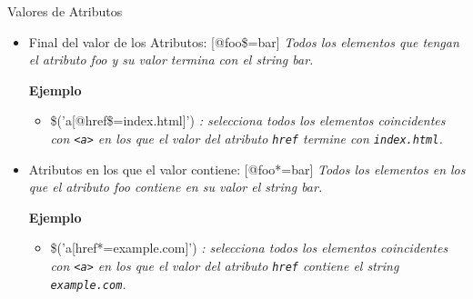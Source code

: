 \begin{frame}[fragile]{Valores de Atributos} %
\begin{itemize}
\item Final del valor de los Atributos: [@foo\$=bar] \textit{Todos los elementos
que tengan el atributo foo y su valor termina con el string bar.}
    
    \textbf{Ejemplo}
    \begin{itemize}
        \item \$('a[@href\$=index.html]') \textit{: selecciona todos los elementos
    coincidentes con \texttt{<a>} en los que el valor del atributo
    \texttt{href} termine con \texttt{index.html}.}
    \end{itemize}

\item Atributos en los que el valor contiene: [@foo*=bar] \textit{Todos los
elementos en los que el atributo foo contiene en su valor el string bar.}
    
    \textbf{Ejemplo}
    \begin{itemize}
        \item \$('a[href*=example.com]') \textit{: selecciona todos los elementos
    coincidentes con \texttt{<a>} en los que el valor del atributo
    \texttt{href} contiene el string \texttt{example.com}.}
    \end{itemize}
\end{itemize}
\end{frame}


